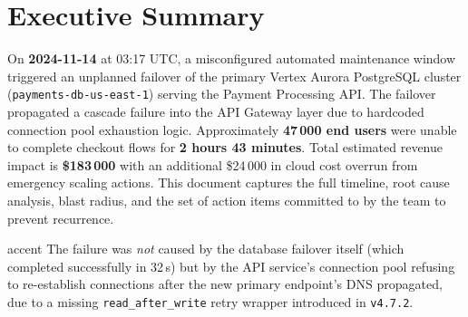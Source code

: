 \section{Executive Summary}

On \textbf{2024-11-14} at 03:17 UTC, a misconfigured automated maintenance window
triggered an unplanned failover of the primary Vertex Aurora PostgreSQL cluster
(\texttt{payments-db-us-east-1}) serving the Payment Processing API. The failover
propagated a cascade failure into the API Gateway layer due to hardcoded connection
pool exhaustion logic. Approximately \textbf{47\,000 end users} were unable to
complete checkout flows for \textbf{2 hours 43 minutes}. Total estimated revenue
impact is \textbf{\$183\,000} with an additional \$24\,000 in cloud cost overrun
from emergency scaling actions. This document captures the full timeline, root
cause analysis, blast radius, and the set of action items committed to by the
team to prevent recurrence.

\begin{callout}[title={\faIcon{lightbulb}\hspace{4pt}Key Finding}]{accent}
The failure was \emph{not} caused by the database failover itself (which completed
successfully in 32\,s) but by the API service's connection pool refusing to
re-establish connections after the new primary endpoint's DNS propagated, due to a
missing \texttt{read\_after\_write} retry wrapper introduced in \texttt{v4.7.2}.
\end{callout}

